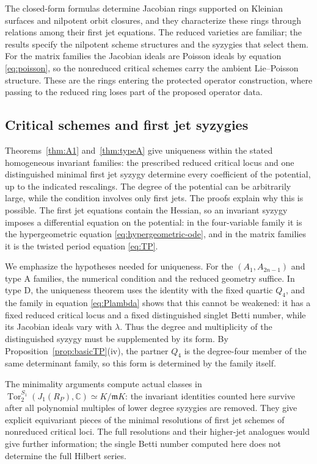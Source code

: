 \documentclass[10pt,reqno]{amsart}
\numberwithin{equation}{section}
\theoremstyle{plain}
\theoremstyle{definition}
\DeclareMathOperator{\Tor}{Tor}
\begin{document}
The closed-form formulas determine Jacobian rings supported on Kleinian surfaces and nilpotent orbit closures, and they characterize these rings through relations among their first jet equations. The reduced varieties are familiar; the results specify the nilpotent scheme structures and the syzygies that select them. For the matrix families the Jacobian ideals are Poisson ideals by equation \eqref{eq:poisson}, so the nonreduced critical schemes carry the ambient Lie--Poisson structure. These are the rings entering the protected operator construction, where passing to the reduced ring loses part of the proposed operator data.

\subsection{Critical schemes and first jet syzygies}

Theorems~\ref{thm:A1} and~\ref{thm:typeA} give uniqueness within the stated homogeneous invariant families: the prescribed reduced critical locus and one distinguished minimal first jet syzygy determine every coefficient of the potential, up to the indicated rescalings. The degree of the potential can be arbitrarily large, while the condition involves only first jets. The proofs explain why this is possible. The first jet equations contain the Hessian, so an invariant syzygy imposes a differential equation on the potential: in the four-variable family it is the hypergeometric equation \eqref{eq:hypergeometric-ode}, and in the matrix families it is the twisted period equation \eqref{eq:TP}.

We emphasize the hypotheses needed for uniqueness. For the $(A_1,A_{2n-1})$ and type A families, the numerical condition and the reduced geometry suffice. In type D, the uniqueness theorem uses the identity with the fixed quartic $Q_4$, and the family in equation \eqref{eq:Plambda} shows that this cannot be weakened: it has a fixed reduced critical locus and a fixed distinguished singlet Betti number, while its Jacobian ideals vary with $\lambda$. Thus the degree and multiplicity of the distinguished syzygy must be supplemented by its form. By Proposition~\ref{prop:basicTP}(iv), the partner $Q_4$ is the degree-four member of the same determinant family, so this form is determined by the family itself.

The minimality arguments compute actual classes in $\Tor^{S_1}_2(J_1(R_P),\mathbb{C})\simeq K/\mathfrak{m} K$: the invariant identities counted here survive after all polynomial multiples of lower degree syzygies are removed. They give explicit equivariant pieces of the minimal resolutions of first jet schemes of nonreduced critical loci. The full resolutions and their higher-jet analogues would give further information; the single Betti number computed here does not determine the full Hilbert series.
\end{document}
